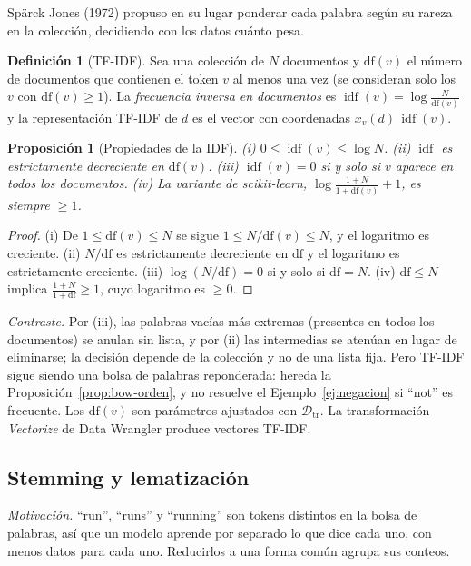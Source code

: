 \documentclass[11pt]{article}
\newtheorem{proposicion}[teorema]{Proposición}
\theoremstyle{definition}
\newtheorem{definicion}[teorema]{Definición}
\theoremstyle{remark}
\DeclareMathOperator{\idf}{idf}
\newcommand{\Dtr}{\mathcal{D}_{\mathrm{tr}}}
\begin{document}
\noindent Spärck Jones (1972) propuso en su lugar ponderar cada palabra según su rareza en la colección, decidiendo con los datos cuánto pesa.

\begin{definicion}[TF-IDF]\label{def:tfidf}
\noindent Sea una colección de $N$ documentos y $\mathrm{df}(v)$ el número de documentos que contienen el token $v$ al menos una vez (se consideran solo los $v$ con $\mathrm{df}(v)\ge1$). La \emph{frecuencia inversa en documentos} es $\idf(v)=\log\frac N{\mathrm{df}(v)}$ y la representación TF-IDF de $d$ es el vector con coordenadas $x_v(d)\,\idf(v)$.
\end{definicion}

\begin{proposicion}[Propiedades de la IDF]\label{prop:idf}
\noindent (i) $0\le\idf(v)\le\log N$. (ii) $\idf$ es estrictamente decreciente en $\mathrm{df}(v)$. (iii) $\idf(v)=0$ si y solo si $v$ aparece en todos los documentos. (iv) La variante de scikit-learn, $\log\frac{1+N}{1+\mathrm{df}(v)}+1$, es siempre $\ge1$.
\end{proposicion}
\begin{proof}
\noindent (i) De $1\le\mathrm{df}(v)\le N$ se sigue $1\le N/\mathrm{df}(v)\le N$, y el logaritmo es creciente. (ii) $N/\mathrm{df}$ es estrictamente decreciente en $\mathrm{df}$ y el logaritmo es estrictamente creciente. (iii) $\log(N/\mathrm{df})=0$ si y solo si $\mathrm{df}=N$. (iv) $\mathrm{df}\le N$ implica $\frac{1+N}{1+\mathrm{df}}\ge1$, cuyo logaritmo es $\ge0$.
\end{proof}

\noindent \emph{Contraste.} Por (iii), las palabras vacías más extremas (presentes en todos los documentos) se anulan sin lista, y por (ii) las intermedias se atenúan en lugar de eliminarse; la decisión depende de la colección y no de una lista fija. Pero TF-IDF sigue siendo una bolsa de palabras reponderada: hereda la Proposición~\ref{prop:bow-orden}, y no resuelve el Ejemplo~\ref{ej:negacion} si ``not'' es frecuente. Los $\mathrm{df}(v)$ son parámetros ajustados con $\Dtr$. La transformación \emph{Vectorize} de Data Wrangler produce vectores TF-IDF.

\subsection{Stemming y lematización}\label{sec:stemming}

\noindent \emph{Motivación.} ``run'', ``runs'' y ``running'' son tokens distintos en la bolsa de palabras, así que un modelo aprende por separado lo que dice cada uno, con menos datos para cada uno. Reducirlos a una forma común agrupa sus conteos.
\end{document}
